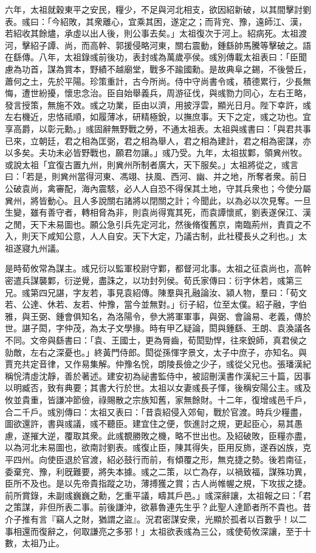 \begin{pinyinscope}
六年，太祖就穀東平之安民，糧少，不足與河北相支，欲因紹新破，以其間擊討劉表。彧曰：「今紹敗，其衆離心，宜乘其困，遂定之；而背兖、豫，遠師江、漢，若紹收其餘燼，承虛以出人後，則公事去矣。」太祖復次于河上。紹病死。太祖渡河，擊紹子譚、尚，而高幹、郭援侵略河東，關右震動，鍾繇帥馬騰等擊破之。語在繇傳。八年，太祖錄彧前後功，表封彧為萬歲亭侯。彧別傳載太祖表曰：「臣聞慮為功首，謀為賞本，野績不越廟堂，戰多不踰國勳。是故典阜之錫，不後營丘，蕭何之土，先於平陽。珍策重計，古今所尚。侍中守尚書令彧，積德累行，少長無悔，遭世紛擾，懷忠念治。臣自始舉義兵，周游征伐，與彧勠力同心，左右王略，發言授策，無施不效。彧之功業，臣由以濟，用披浮雲，顯光日月。陛下幸許，彧左右機近，忠恪祗順，如履薄冰，研精極銳，以撫庶事。天下之定，彧之功也。宜享高爵，以彰元勳。」彧固辭無野戰之勞，不通太祖表。太祖與彧書曰：「與君共事已來，立朝廷，君之相為匡弼，君之相為舉人，君之相為建計，君之相為密謀，亦以多矣。夫功未必皆野戰也，願君勿讓。」彧乃受。九年，太祖拔鄴，領兾州牧。或說太祖「宜復古置九州，則兾州所制者廣大，天下服矣。」太祖將從之，彧言曰：「若是，則兾州當得河東、馮翊、扶風、西河、幽、并之地，所奪者衆。前日公破袁尚，禽審配，海內震駭，必人人自恐不得保其土地，守其兵衆也；今使分屬兾州，將皆動心。且人多說關右諸將以閉關之計；今聞此，以為必以次見奪。一旦生變，雖有善守者，轉相脅為非，則袁尚得寬其死，而袁譚懷貳，劉表遂保江、漢之閒，天下未易圖也。願公急引兵先定河北，然後脩復舊京，南臨荊州，責貢之不入，則天下咸知公意，人人自安。天下大定，乃議古制，此社稷長乆之利也。」太祖遂寢九州議。

是時荀攸常為謀主。彧兄衍以監軍校尉守鄴，都督河北事。太祖之征袁尚也，高幹密遣兵謀襲鄴，衍逆覺，盡誅之，以功封列侯。荀氏家傳曰：衍字休若，彧第三兄。彧第四兄諶，字友若，事見袁紹傳。陳羣與孔融論汝、潁人物，羣曰：「荀文若、公達、休若、友若、仲豫，當今並無對。」衍子紹，位至太僕。紹子融，字伯雅，與王弼、鍾會俱知名，為洛陽令，參大將軍軍事，與弼、會論易、老義，傳於世。諶子閎，字仲茂，為太子文學掾。時有甲乙疑論，閎與鍾繇、王朗、袁渙議各不同。文帝與繇書曰：「袁、王國士，更為脣齒，荀閎勁悍，往來銳師，真君侯之勍敵，左右之深憂也。」終黃門侍郎。閎從孫惲字景文，太子中庶子，亦知名。與賈充共定音律，又作易集解。仲豫名恱，朗陵長儉之少子，彧從父兄也。張璠漢紀稱恱清虛沈靜，善於著述。建安初為祕書監侍中，被詔刪漢書作漢紀三十篇，因事以明臧否，致有典要；其書大行於世。太祖以女妻彧長子惲，後稱安陽公主。彧及攸並貴重，皆謙冲節儉，祿賜散之宗族知舊，家無餘財。十二年，復增彧邑千戶，合二千戶。彧別傳曰：太祖又表曰：「昔袁紹侵入郊甸，戰於官渡。時兵少糧盡，圖欲還許，書與彧議，彧不聽臣。建宜住之便，恢進討之規，更起臣心，易其愚慮，遂摧大逆，覆取其衆。此彧覩勝敗之機，略不世出也。及紹破敗，臣糧亦盡，以為河北未易圖也，欲南討劉表。彧復止臣，陳其得失，臣用反斾，遂吞凶族，克平四州。向使臣退於官渡，紹必鼓行而前，有傾覆之形，無克捷之勢。後若南征，委棄兖、豫，利旣難要，將失本據。彧之二策，以亡為存，以禍致福，謀殊功異，臣所不及也。是以先帝貴指蹤之功，薄搏獲之賞；古人尚帷幄之規，下攻拔之捷。前所賞錄，未副彧巍巍之勳，乞重平議，疇其戶邑。」彧深辭讓，太祖報之曰：「君之策謀，非但所表二事。前後謙沖，欲慕魯連先生乎？此聖人達節者所不貴也。昔介子推有言『竊人之財，猶謂之盜』。況君密謀安衆，光顯於孤者以百數乎！以二事相還而復辭之，何取謙亮之多邪！」太祖欲表彧為三公，彧使荀攸深讓，至于十數，太祖乃止。


\end{pinyinscope}
